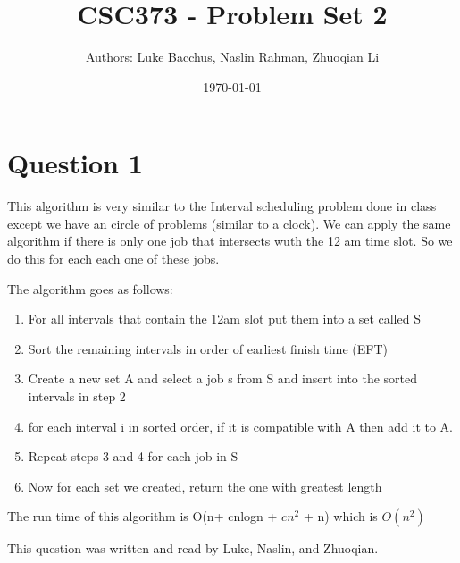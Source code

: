 \documentclass[12pt]{article}
\title{\textbf{CSC373 - Problem Set 2}}
\author{Authors: Luke Bacchus, Naslin Rahman, Zhuoqian Li}
\date{\today}
\begin{document}
\maketitle
\section*{Question 1}
This algorithm is very similar to the Interval scheduling problem done in class except we have an circle of problems (similar to a clock). We can apply the same algorithm if there is only one job that intersects wuth the 12 am time slot. So we do this for each each one of these jobs.
 
 The algorithm goes as follows:
 \begin{enumerate}
     \item For all intervals that contain the 12am slot put them into a set called S
     \item Sort the remaining intervals in order of earliest finish time (EFT)
     \item Create a new set A and select a job s from S and insert into the sorted intervals in step 2
     \item for each interval i in sorted order, if it is compatible with A then add it to A. 
     \item Repeat steps 3 and 4 for each job in S 
     \item Now for each set we created, return the one with greatest length
 \end{enumerate}

The run time of this algorithm is O(n+ cnlogn + $cn^2$ + n) which is $O(n^2)$

This question was written and read by  Luke, Naslin, and Zhuoqian.
\newpage
\end{document}
